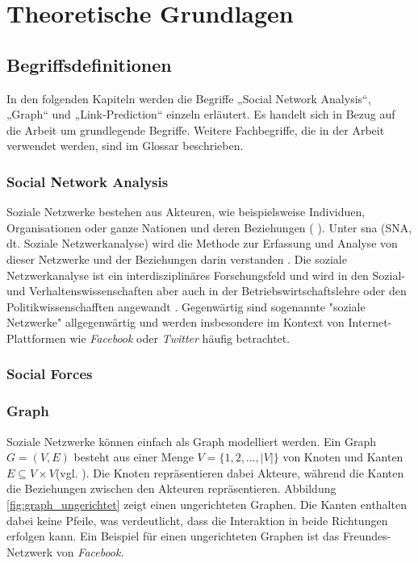 \chapter{Theoretische Grundlagen}

\section{Begriffsdefinitionen}
In den folgenden Kapiteln werden die Begriffe „Social Network Analysis“, „Graph“ und „Link-Prediction“ einzeln
erläutert. Es handelt sich in Bezug auf die Arbeit um grundlegende Begriffe. Weitere Fachbegriffe, die
in der Arbeit verwendet werden, sind im Glossar beschrieben.

\subsection{Social Network Analysis}
Soziale Netzwerke bestehen aus Akteuren, wie beispielsweise Individuen, Organisationen oder ganze Nationen und deren Beziehungen (\citeauthor{ulrike_baumol_soziale_2019} \citeyear{ulrike_baumol_soziale_2019}).
Unter \acl{sna} (SNA, dt. Soziale Netzwerkanalyse) wird die Methode zur Erfassung und Analyse von dieser Netzwerke und der Beziehungen darin verstanden \cite{noauthor_soziale_2019}.
Die soziale Netzwerkanalyse ist ein interdisziplinäres Forschungsfeld und wird in den Sozial- und Verhaltenswissenschaften aber auch in der Betriebswirtschaftslehre oder den Politikwissenschafften angewandt \cite{ulrike_baumol_soziale_2019}.
Gegenwärtig sind sogenannte "soziale Netzwerke" allgegenwärtig und werden insbesondere im Kontext von Internet-Plattformen wie \textit{Facebook} oder \textit{Twitter} häufig betrachtet.

\subsection{Social Forces}
\label{socialforces}

\subsection{Graph}
Soziale Netzwerke können einfach als Graph modelliert werden.
Ein Graph $G = (V, E)$ besteht aus einer Menge $V = \{1,2,...,|V|\}$ von Knoten und Kanten $E \subseteq V\times V $(vgl. \cite{ottmann_algorithmen_2017}).
Die Knoten repräsentieren dabei Akteure, während die Kanten die Beziehungen zwischen den Akteuren repräsentieren.
Abbildung \ref{fig:graph_ungerichtet} zeigt einen ungerichteten Graphen. Die Kanten enthalten dabei keine Pfeile, was verdeutlicht, dass die Interaktion in beide Richtungen erfolgen kann.
Ein Beispiel für einen ungerichteten Graphen ist das Freundes-Netzwerk von \textit{Facebook}.

